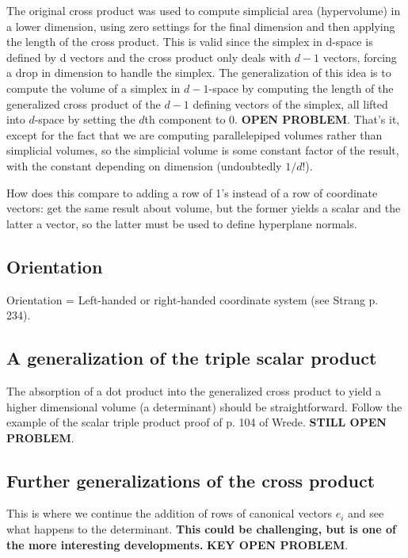\documentclass[10pt]{article}
\begin{document}
The original cross product was used to compute simplicial 
area (hypervolume) in a lower dimension, using zero settings for the final dimension and
then applying the length of the cross product.
This is valid since the simplex in d-space is defined by d vectors and the cross product
only deals with $d-1$ vectors, forcing a drop in dimension to handle the simplex.
The generalization of this idea is to compute the volume of a simplex in $d-1$-space
by computing the length of the generalized cross product of the $d-1$ defining vectors
of the simplex, all lifted into $d$-space by setting the $d$th component to 0.
{\bf OPEN PROBLEM}.
That's it, except for the fact that we are computing parallelepiped volumes rather than
simplicial volumes, so the simplicial volume is some constant factor of the result,
with the constant depending on dimension (undoubtedly $1/d!$).

How does this compare to adding a row of 1's instead of a row of coordinate vectors:
get the same result about volume, but the former yields a scalar and the latter a vector,
so the latter must be used to define hyperplane normals.

\subsection{Orientation}

Orientation = Left-handed or right-handed coordinate system (see Strang p. 234).

\subsection{A generalization of the triple scalar product}

The absorption of a dot product into the generalized cross product
to yield a higher dimensional volume (a determinant) should be straightforward.
Follow the example of the scalar triple product proof of p. 104 of Wrede.
{\bf STILL OPEN PROBLEM}.

\subsection{Further generalizations of the cross product}

This is where we continue the addition of rows of canonical vectors $e_i$
and see what happens to the determinant.
{\bf This could be challenging, but is one of the more interesting developments.}
{\bf KEY OPEN PROBLEM}.
\end{document}
